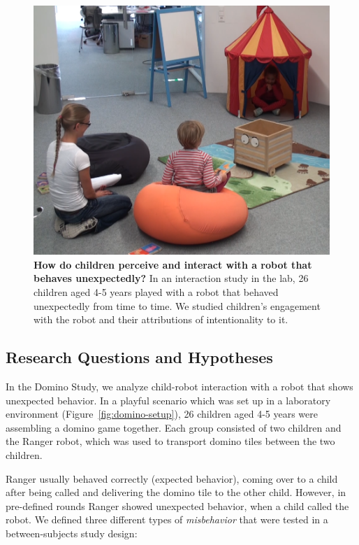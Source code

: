 \documentclass{sig-alternate}
\begin{document}
\begin{figure}[!h] 
    \centering 
    \includegraphics[width=0.5\columnwidth]{domino_header.png} 
    \caption[How do Children Interact with a Robot that Behaves
    Unexpectedly?]{\small \textbf{How do children perceive and interact with a
    robot that behaves unexpectedly?} In an interaction study in the lab, 26
    children aged 4-5 years played with a robot that behaved unexpectedly from time
    to time. We studied children's engagement with the robot and their attributions
    of intentionality to it.}

    \label{fig:domino-header} 
\end{figure}	

\subsection{Research Questions and Hypotheses}

In the Domino Study, we analyze child-robot interaction with a robot that shows
unexpected behavior. In a playful scenario which was set up in a laboratory
environment (Figure~\ref{fig:domino-setup}), 26 children aged 4-5 years were
assembling a domino game together. Each group consisted of two children and the
Ranger robot, which was used to transport domino tiles between the two children.

Ranger usually behaved correctly (expected behavior), coming over to a child
after being called and delivering the domino tile to the other child. However,
in pre-defined rounds Ranger showed unexpected behavior, when a child called the
robot. We defined three different types of \textit{misbehavior} that were tested
in a between-subjects study design:
\end{document}
